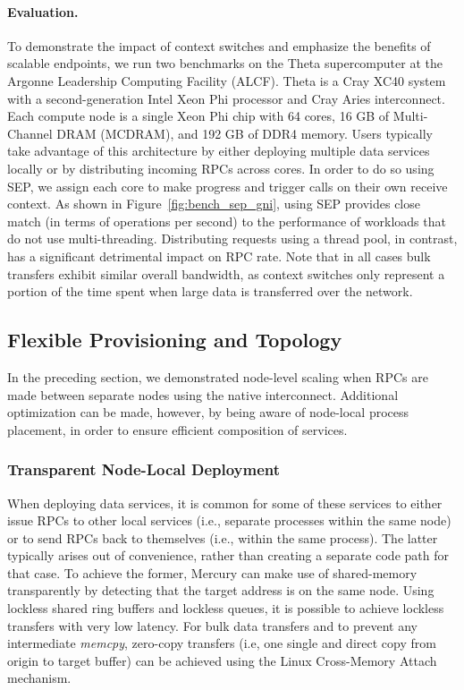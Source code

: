 \documentclass[11pt]{article}
\begin{document}
\paragraph{Evaluation.} To demonstrate the impact of context switches
and emphasize the benefits of scalable endpoints, we run two
benchmarks on the Theta supercomputer at the Argonne Leadership Computing Facility (ALCF).
Theta is a Cray XC40 system with a second-generation Intel Xeon Phi processor and
Cray Aries interconnect. Each compute node is a single Xeon Phi chip with 64 cores,
16 GB of Multi-Channel DRAM (MCDRAM), and 192 GB of DDR4 memory.
Users typically take advantage of this architecture by either deploying
multiple data services locally or by distributing incoming RPCs across cores.
%
In order to do so using SEP, we assign each core
to make progress and trigger calls on their own receive context.
As shown in Figure~\ref{fig:bench_sep_gni}, using SEP provides
close match (in terms of operations per second) to the performance of workloads
that do not use multi-threading. 
%
Distributing requests using a thread pool, in contrast, has a significant
detrimental impact on RPC rate.  Note that in all cases bulk transfers
exhibit similar overall bandwidth, as context switches only represent a
portion of the time spent when large data is transferred over the network.

\subsection{Flexible Provisioning and Topology}
\label{sec:local_deployment}

In the preceding section, we demonstrated node-level scaling when RPCs are made between
separate nodes using the native interconnect. Additional optimization can be made,
however, by being aware of node-local process placement, in order to ensure efficient
composition of services.

\subsubsection{Transparent Node-Local Deployment}

When deploying data
services, it is common for some of these services to either issue
RPCs to other local services (i.e., separate processes within the same node) or
to send RPCs back to themselves (i.e., within the same process).
The latter typically arises out of convenience, rather than creating a separate code path for
that case.
To achieve the former,
Mercury can make use of shared-memory transparently by detecting that
the target address is on the same node. Using lockless shared ring buffers and
lockless queues, it is possible to achieve lockless transfers with very low
latency. For bulk data transfers and to prevent any intermediate \textit{memcpy},
zero-copy transfers (i.e, one single and direct copy from origin to target buffer) can be
achieved using the Linux Cross-Memory Attach mechanism.
\end{document}
